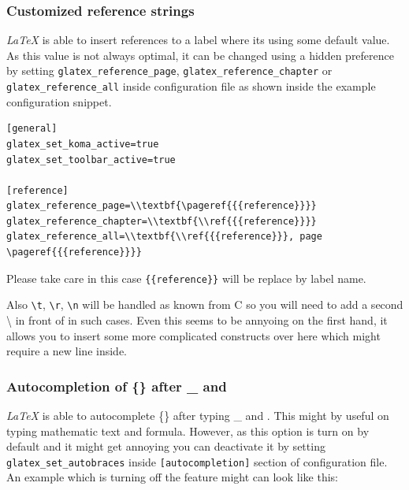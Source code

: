 \documentclass[%
paper=a4,%
fontsize=11pt,%
twoside=false,%
DIV18,%
headsepline,%
plainheadsepline,%
footsepline,%
plainfootsepline,%
bibliography=totoc,%
listof=totoc,%
BCOR10mm,%
parskip=half,%
openany,%
]{scrartcl}
\begin{document}
\subsubsection{Customized reference strings}

\textit{LaTeX} is able to insert references to a label where its
using some default value. As this value is not always optimal, it
can be changed using a hidden preference by setting
\texttt{glatex\_reference\_page}, \texttt{glatex\_reference\_chapter} or
\texttt{glatex\_reference\_all} inside configuration file as shown inside
the example configuration snippet.

\begin{lstlisting}[caption={Configuration example for customized reference strings}]
[general]
glatex_set_koma_active=true
glatex_set_toolbar_active=true

[reference]
glatex_reference_page=\\textbf{\pageref{{{reference}}}}
glatex_reference_chapter=\\textbf{\\ref{{{reference}}}}
glatex_reference_all=\\textbf{\\ref{{{reference}}}, page \pageref{{{reference}}}}
\end{lstlisting}

Please take care in this case \texttt{\{\{reference\}\}} will be
replace by label name.

Also \texttt{\textbackslash{}t}, \texttt{\textbackslash{}r},
\texttt{\textbackslash{}n} will be handled as known from C so you will
need to add a second \textbackslash{} in front of in such cases. Even
this seems to be annyoing on the first hand, it allows you to insert some
more complicated constructs over  here which might require a new line inside.


\subsubsection{Autocompletion of \{\} after \_ and }
\label{sec:autoadding_of_braces}
\textit{LaTeX} is able to autocomplete \{\} after typing \_ and
. This might by useful on typing mathematic text and
formula. However, as this option is turn on by default and it might
get annoying you can deactivate it by setting \texttt{glatex\_set\_autobraces}
inside \texttt{[autocompletion]} section of configuration file. An example
which is turning off the feature might can look like this:
\end{document}
